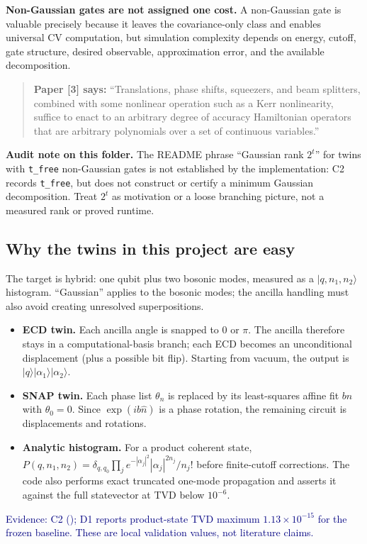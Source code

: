\documentclass[10pt]{article}
\newcommand{\code}[1]{\texttt{#1}}
\newcommand{\evidence}[1]{\textcolor{navy}{\footnotesize\textsf{Evidence: #1}}}
\newcommand{\paperquote}[2]{%
  \begin{quote}\small\textbf{Paper [#1] says:} ``#2''\end{quote}}
\begin{document}
\textbf{Non-Gaussian gates are not assigned one cost.} A non-Gaussian gate is valuable precisely
because it leaves the covariance-only class and enables universal CV computation, but simulation
complexity depends on energy, cutoff, gate structure, desired observable, approximation error, and
the available decomposition.

\paperquote{3}{Translations, phase shifts, squeezers, and beam splitters, combined with some
nonlinear operation such as a Kerr nonlinearity, suffice to enact to an arbitrary degree of accuracy
Hamiltonian operators that are arbitrary polynomials over a set of continuous variables.}

\textbf{Audit note on this folder.} The README phrase ``Gaussian rank \(2^t\)'' for twins with
\code{t\_free} non-Gaussian gates is not established by the implementation: C2 records
\code{t\_free}, but does not construct or certify a minimum Gaussian decomposition. Treat
\(2^t\) as motivation or a loose branching picture, not a measured rank or proved runtime.

\subsection{Why the twins in this project are easy}

The target is hybrid: one qubit plus two bosonic modes, measured as a
$|q,n_1,n_2\rangle$ histogram. ``Gaussian'' applies to the bosonic modes; the ancilla handling must
also avoid creating unresolved superpositions.

\begin{itemize}
\item \textbf{ECD twin.} Each ancilla angle is snapped to $0$ or $\pi$. The ancilla therefore stays
in a computational-basis branch; each ECD becomes an unconditional displacement (plus a possible
bit flip). Starting from vacuum, the output is
$|q\rangle|\alpha_1\rangle|\alpha_2\rangle$.
\item \textbf{SNAP twin.} Each phase list $\theta_n$ is replaced by its least-squares affine fit
$bn$ with $\theta_0=0$. Since $\exp(i b\hat n)$ is a phase rotation, the remaining circuit is
displacements and rotations.
\item \textbf{Analytic histogram.} For a product coherent state,
$P(q,n_1,n_2)=\delta_{q,q_0}\prod_j e^{-|\alpha_j|^2}|\alpha_j|^{2n_j}/n_j!$
before finite-cutoff corrections. The code also performs exact truncated one-mode propagation and
asserts it against the full statevector at TVD below $10^{-6}$.
\end{itemize}
\evidence{C2 (); D1 reports product-state TVD maximum
\(1.13\times10^{-15}\) for the frozen baseline. These are local validation values, not literature
claims.}
\end{document}
